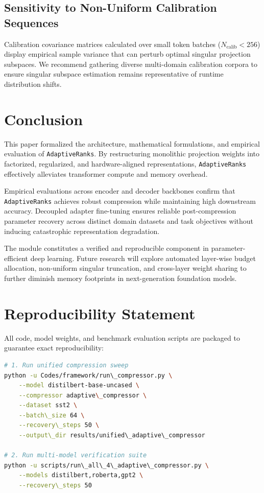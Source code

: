 \subsection{Sensitivity to Non-Uniform Calibration Sequences}
Calibration covariance matrices calculated over small token batches ($N_{\text{calib}} < 256$) display empirical sample variance that can perturb optimal singular projection subspaces. We recommend gathering diverse multi-domain calibration corpora to ensure singular subspace estimation remains representative of runtime distribution shifts.


\section{Conclusion}
This paper formalized the architecture, mathematical formulations, and empirical evaluation of \texttt{AdaptiveRanks}. By restructuring monolithic projection weights into factorized, regularized, and hardware-aligned representations, \texttt{AdaptiveRanks} effectively alleviates transformer compute and memory overhead.

Empirical evaluations across encoder and decoder backbones confirm that \texttt{AdaptiveRanks} achieves robust compression while maintaining high downstream accuracy. Decoupled adapter fine-tuning ensures reliable post-compression parameter recovery across distinct domain datasets and task objectives without inducing catastrophic representation degradation.

The module constitutes a verified and reproducible component in parameter-efficient deep learning. Future research will explore automated layer-wise budget allocation, non-uniform singular truncation, and cross-layer weight sharing to further diminish memory footprints in next-generation foundation models.


\section{Reproducibility Statement}
All code, model weights, and benchmark evaluation scripts are packaged to guarantee exact reproducibility:
\begin{lstlisting}[language=bash]
# 1. Run unified compression sweep
python -u Codes/framework/run\_compressor.py \
    --model distilbert-base-uncased \
    --compressor adaptive\_compressor \
    --dataset sst2 \
    --batch\_size 64 \
    --recovery\_steps 50 \
    --output\_dir results/unified\_adaptive\_compressor

# 2. Run multi-model verification suite
python -u scripts/run\_all\_4\_adaptive\_compressor.py \
    --models distilbert,roberta,gpt2 \
    --recovery\_steps 50
\end{lstlisting}


